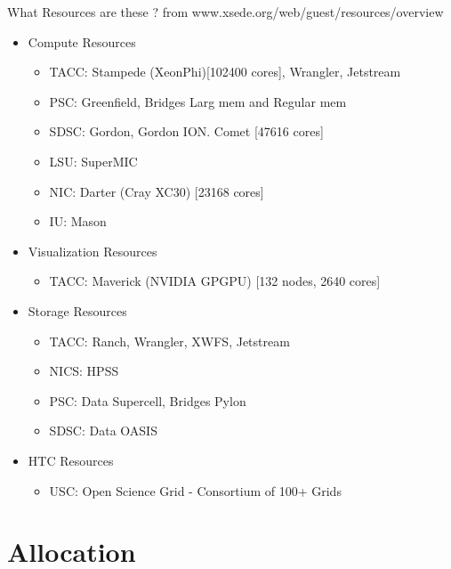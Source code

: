 \documentclass[compress,10pt]{beamer}
\begin{document}
\begin{frame}{What Resources are these ?}
from www.xsede.org/web/guest/resources/overview
\begin{itemize}
\item Compute Resources
\begin{itemize}

\item TACC: Stampede (XeonPhi)[102400 cores], Wrangler, Jetstream
\item PSC: Greenfield, Bridges Larg mem and Regular mem
\item SDSC: Gordon, Gordon ION. Comet [47616 cores]
\item LSU: SuperMIC 
\item NIC: Darter (Cray XC30) [23168 cores]
\item IU: Mason
\end{itemize}

\pause

\item Visualization Resources

\begin{itemize}
\item TACC: Maverick (NVIDIA GPGPU) [132 nodes, 2640 cores]
\end{itemize}

\pause

\item Storage Resources

\begin{itemize}
\item TACC: Ranch, Wrangler, XWFS, Jetstream
\item NICS: HPSS
\item PSC: Data Supercell, Bridges Pylon
\item SDSC: Data OASIS
\end{itemize}

\pause

\item HTC Resources

\begin{itemize}
\item USC: Open Science Grid - Consortium of 100+ Grids
\end{itemize}

\end{itemize}

\end{frame}


\section{Allocation}
\end{document}
